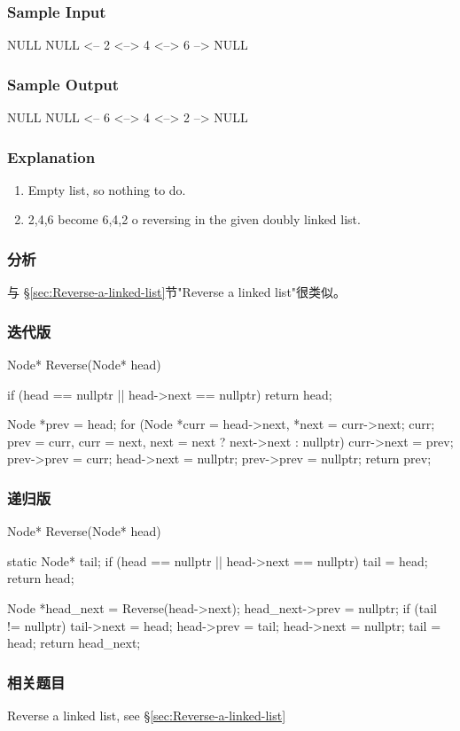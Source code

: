 \subsubsection{Sample Input}
\begin{Code}
NULL
NULL <– 2 <–> 4 <–> 6 –> NULL
\end{Code}


\subsubsection{Sample Output}
\begin{Code}
NULL
NULL <-- 6 <--> 4 <--> 2 --> NULL
\end{Code}


\subsubsection{Explanation}
\begin{enumerate}
\item Empty list, so nothing to do.
\item 2,4,6 become 6,4,2 o reversing in the given doubly linked list.
\end{enumerate}


\subsubsection{分析}
与 \S \ref{sec:Reverse-a-linked-list}节"Reverse a linked list"很类似。


\subsubsection{迭代版}
\begin{Code}
Node* Reverse(Node* head) {
    if (head == nullptr || head->next == nullptr) return head;

    Node *prev = head;
    for (Node *curr = head->next, *next = curr->next; curr;
        prev = curr, curr = next, next = next ? next->next : nullptr) {
            curr->next = prev;
            prev->prev = curr;
    }
    head->next = nullptr;
    prev->prev = nullptr;
    return prev;
}
\end{Code}


\subsubsection{递归版}
\begin{Code}
Node* Reverse(Node* head) {
    static Node* tail;
    if (head == nullptr || head->next == nullptr) {
        tail = head;
        return head;
    }

    Node *head_next = Reverse(head->next);
    head_next->prev = nullptr;
    if (tail != nullptr) {
        tail->next = head;
        head->prev = tail;
        head->next = nullptr;
    }
    tail = head;
    return head_next;
}
\end{Code}


\subsubsection{相关题目}
\begindot
\item Reverse a linked list, see \S \ref{sec:Reverse-a-linked-list}
\myenddot
